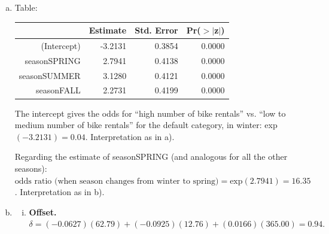 {\begin{enumerate}[a)]
    and for fall:
    \[
    \text{odds ratio} 
    = \frac{P(y=1\, | \,\texttt{season}=\text{FALL})\,/\,P(y=0\, | \,\texttt{season}=\text{FALL})}{P(y=1\, | \,\texttt{season}=\text{WINTER})\,/\,P(y=0\, | \,\texttt{season}=\text{WINTER})}
    = \frac{50/128}{7/174} = 9.71.
    \]
    
	\textbf{Interpretation:} The chances (the odds) of having "high bike rentals" are $16.35$ times higher in season SPRING compared to the reference category (WINTER).
    As in winter the odds of ``$y=0$'' are $25:1$, this means in spring they are roughly $(25:16):1$, which means roughly $5:3$.
    Similarly, in summer the odds are $22.83$ times higher that in winter, which means that in summer they are close to $1:1$ (since in winter they were $1:25$), so the chances in summer are roughly 50-50.

	\item\label{ex_sol:logreg_GLM_single_feature}
    Table:
	\begin{table}[!ht]
		\centering
		\begin{tabular}{rrrr}
			\hline
			& Estimate & Std. Error & Pr($>$$|$z$|$) \\ 
			\hline
			(Intercept) & -3.2131 & 0.3854 & 0.0000 \\ 
			seasonSPRING & 2.7941 & 0.4138 & 0.0000 \\ 
			seasonSUMMER & 3.1280 & 0.4121 & 0.0000 \\ 
			seasonFALL & 2.2731 & 0.4199 & 0.0000 \\ 
			\hline
		\end{tabular}
	\end{table}

	The intercept gives the odds for ``high number of bike rentals'' vs. ``low to medium number of bike rentals'' for the default category, in winter: exp$(-3.2131) = 0.04$. Interpretation as in a).
	
	Regarding the estimate of seasonSPRING (and analogous for all the other seasons): $\text{odds ratio (when season changes from winter to spring)} = \text{exp}(2.7941) =  16.35$. Interpretation as in b).

    \item\label{ex_sol:logreg_GLM_more_features}

    \begin{enumerate}[(i)]
    
        \item\textbf{Offset.}
        $
        \delta=
        (-0.0627)(62.79)
        +(-0.0925)(12.76)
        +(0.0166)(365.00)
        =\boxed{0.94}.
        $
        

\end{enumerate}
\end{enumerate}}
